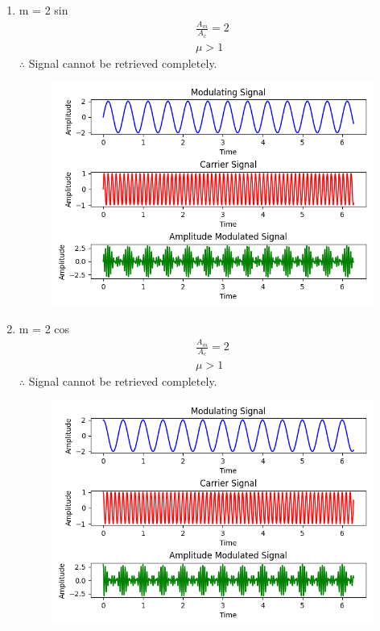 \documentclass[journal,12pt,twocolumn]{IEEEtran}
\theoremstyle{remark}
\begin{document}
\begin{enumerate}
\begin{figure}[h]
\end{figure}
\item m = 2 sin 
\begin{align}
    \frac{A_m}{A_c}= 2\\
    \mu >1
\end{align}
$\therefore$ Signal cannot be retrieved completely.
\renewcommand{\thefigure}{\theenumi}
 \renewcommand{\thetable}{\theenumi}
\begin{figure}[h]
  
  \includegraphics[width=\columnwidth]{figs/Figure_3.png}
  
\end{figure}
\item m = 2 cos 
\begin{align}
    \frac{A_m}{A_c}= 2\\
    \mu > 1
\end{align}
$\therefore$ Signal cannot be retrieved completely.
\renewcommand{\thefigure}{\theenumi}
 \renewcommand{\thetable}{\theenumi}
\begin{figure}[h]
  
  \includegraphics[width=\columnwidth]{figs/Figure_4.png}
  
\end{figure}
\end{enumerate}
 
\end{document}
